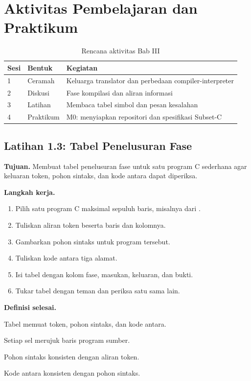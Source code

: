\section*{Aktivitas Pembelajaran dan Praktikum}

\begin{table}[H]
\centering
\caption{Rencana aktivitas Bab III}
\label{tab:ch03-aktivitas}
\begin{tabularx}{\textwidth}{@{}llX@{}}
\toprule
\textbf{Sesi} & \textbf{Bentuk} & \textbf{Kegiatan} \\
\midrule
1 & Ceramah & Keluarga translator dan perbedaan compiler-interpreter \\
2 & Diskusi & Fase kompilasi dan aliran informasi \\
3 & Latihan & Membaca tabel simbol dan pesan kesalahan \\
4 & Praktikum & M0: menyiapkan repositori dan spesifikasi Subset-C \\
\bottomrule
\end{tabularx}
\end{table}

\subsection*{Latihan 1.3: Tabel Penelusuran Fase}
\textbf{Tujuan.} Membuat tabel penelusuran fase untuk satu program C
sederhana agar keluaran token, pohon sintaks, dan kode antara dapat
diperiksa.

\textbf{Langkah kerja.}
\begin{enumerate}[label=\arabic*.,leftmargin=*]
  \item Pilih satu program C maksimal sepuluh baris, misalnya dari
        .
  \item Tuliskan aliran token beserta baris dan kolomnya.
  \item Gambarkan pohon sintaks untuk program tersebut.
  \item Tuliskan kode antara tiga alamat.
  \item Isi tabel dengan kolom fase, masukan, keluaran, dan bukti.
  \item Tukar tabel dengan teman dan periksa satu sama lain.
\end{enumerate}

\textbf{Definisi selesai.}
\begin{checklist}
  \item Tabel memuat token, pohon sintaks, dan kode antara.
  \item Setiap sel merujuk baris program sumber.
  \item Pohon sintaks konsisten dengan aliran token.
  \item Kode antara konsisten dengan pohon sintaks.
\end{checklist}

